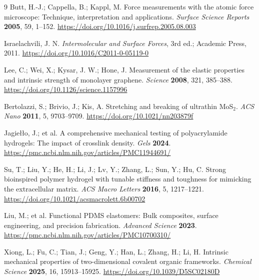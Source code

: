 \documentclass[UTF8,11pt,fontset=fandol]{ctexart}
\begin{document}
\begin{thebibliography}{9}
Butt, H.-J.; Cappella, B.; Kappl, M. Force measurements with the atomic force microscope: Technique, interpretation and applications. \textit{Surface Science Reports} \textbf{2005}, 59, 1--152. \url{https://doi.org/10.1016/j.surfrep.2005.08.003}

Israelachvili, J. N. \textit{Intermolecular and Surface Forces}, 3rd ed.; Academic Press, 2011. \url{https://doi.org/10.1016/C2011-0-05119-0}

Lee, C.; Wei, X.; Kysar, J. W.; Hone, J. Measurement of the elastic properties and intrinsic strength of monolayer graphene. \textit{Science} \textbf{2008}, 321, 385--388. \url{https://doi.org/10.1126/science.1157996}

Bertolazzi, S.; Brivio, J.; Kis, A. Stretching and breaking of ultrathin MoS$_2$. \textit{ACS Nano} \textbf{2011}, 5, 9703--9709. \url{https://doi.org/10.1021/nn203879f}

Jagiełło, J.; et al. A comprehensive mechanical testing of polyacrylamide hydrogels: The impact of crosslink density. \textit{Gels} \textbf{2024}. \url{https://pmc.ncbi.nlm.nih.gov/articles/PMC11944691/}

Su, T.; Liu, Y.; He, H.; Li, J.; Lv, Y.; Zhang, L.; Sun, Y.; Hu, C. Strong bioinspired polymer hydrogel with tunable stiffness and toughness for mimicking the extracellular matrix. \textit{ACS Macro Letters} \textbf{2016}, 5, 1217--1221. \url{https://doi.org/10.1021/acsmacrolett.6b00702}

Liu, M.; et al. Functional PDMS elastomers: Bulk composites, surface engineering, and precision fabrication. \textit{Advanced Science} \textbf{2023}. \url{https://pmc.ncbi.nlm.nih.gov/articles/PMC10700310/}

Xiong, L.; Fu, C.; Tian, J.; Geng, Y.; Han, L.; Zhang, H.; Li, H. Intrinsic mechanical properties of two-dimensional covalent organic frameworks. \textit{Chemical Science} \textbf{2025}, 16, 15913--15925. \url{https://doi.org/10.1039/D5SC02180D}
\end{thebibliography}
\end{document}
